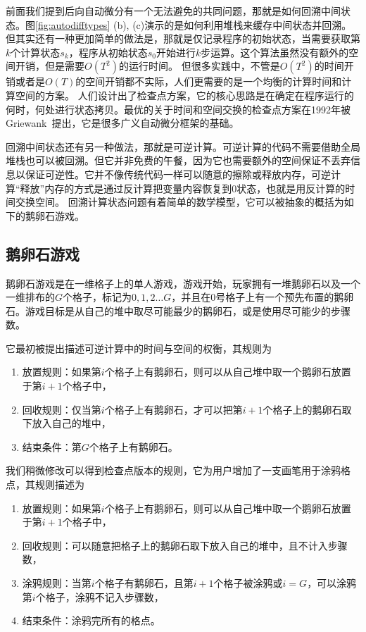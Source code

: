 \documentclass[A4,twoside,fontset=ubuntu,UTF8]{ctexart}
\begin{document}
前面我们提到后向自动微分有一个无法避免的共同问题，那就是如何回溯中间状态。图\ref{fig:autodifftypes} (b), (c)演示的是如何利用堆栈来缓存中间状态并回溯。但其实还有一种更加简单的做法是，那就是仅记录程序的初始状态，当需要获取第$k$个计算状态$s_k$，程序从初始状态$s_0$开始进行$k$步运算。这个算法虽然没有额外的空间开销，但是需要$O(T^2)$的运行时间。
但很多实践中，不管是$O(T^2)$的时间开销或者是$O(T)$的空间开销都不实际，人们更需要的是一个均衡的计算时间和计算空间的方案。
人们设计出了检查点方案，它的核心思路是在确定在程序运行的何时，何处进行状态拷贝。最优的关于时间和空间交换的检查点方案在1992年被Griewank~\cite{Griewank1992}提出，它是很多广义自动微分框架的基础。
 
回溯中间状态还有另一种做法，那就是可逆计算。可逆计算的代码不需要借助全局堆栈也可以被回溯。但它并非免费的午餐，因为它也需要额外的空间保证不丢弃信息以保证可逆性。它并不像传统代码一样可以随意的擦除或释放内存，可逆计算“释放”内存的方式是通过反计算把变量内容恢复到0状态，也就是用反计算的时间交换空间。
回溯计算状态问题有着简单的数学模型，它可以被抽象的概括为如下的鹅卵石游戏。

\subsection{鹅卵石游戏}
鹅卵石游戏是在一维格子上的单人游戏，游戏开始，玩家拥有一堆鹅卵石以及一个一维排布的$G$个格子，标记为$0,1,2\ldots G$，并且在$0$号格子上有一个预先布置的鹅卵石。游戏目标是从自己的堆中取尽可能最少的鹅卵石，或是使用尽可能少的步骤数。

它最初被提出描述可逆计算中的时间与空间的权衡，其规则为
\begin{enumerate}
    \item 放置规则：如果第$i$个格子上有鹅卵石，则可以从自己堆中取一个鹅卵石放置于第$i+1$个格子中，
    \item 回收规则：仅当第$i$个格子上有鹅卵石，才可以把第$i+1$个格子上的鹅卵石取下放入自己的堆中，
    \item 结束条件：第$G$个格子上有鹅卵石。
\end{enumerate}

我们稍微修改可以得到检查点版本的规则，它为用户增加了一支画笔用于涂鸦格点，其规则描述为
\begin{enumerate}
    \item 放置规则：如果第$i$个格子上有鹅卵石，则可以从自己堆中取一个鹅卵石放置于第$i+1$个格子中，
    \item 回收规则：可以随意把格子上的鹅卵石取下放入自己的堆中，且不计入步骤数，
    \item 涂鸦规则：当第$i$个格子有鹅卵石，且第$i+1$个格子被涂鸦或$i=G$，可以涂鸦第$i$个格子，涂鸦不记入步骤数，
    \item 结束条件：涂鸦完所有的格点。
\end{enumerate}
\end{document}
